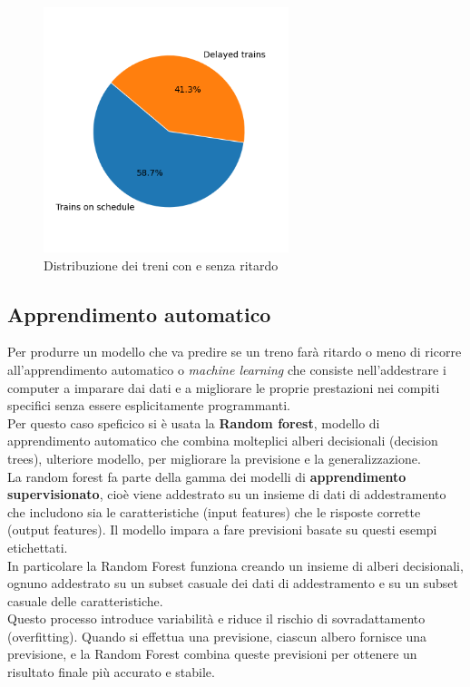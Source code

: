 \documentclass[italian,12pt,a4paper]{article}
\begin{document}
			\begin{figure}[!h]
				\centering
				\includegraphics[width=270px]{img/delay_graph}
				\caption{Distribuzione dei treni con e senza ritardo}
			\end{figure}
			
	\subsection{Apprendimento automatico}
	Per produrre un modello che va predire se un treno farà ritardo o meno di ricorre all'apprendimento automatico o \textit{machine learning} che consiste nell'addestrare i computer a imparare dai dati e a migliorare le proprie prestazioni nei compiti specifici senza essere esplicitamente programmanti.\\
	\linebreak
	Per questo caso speficico si è usata la \textbf{Random forest}, modello di apprendimento automatico che combina molteplici alberi decisionali (decision trees), ulteriore modello, per migliorare la previsione e la generalizzazione.\\
	La random forest fa parte della gamma dei modelli di \textbf{apprendimento supervisionato}, cioè viene addestrato su un insieme di dati di addestramento che includono sia le caratteristiche (input features) che le risposte corrette (output features). 
	Il modello impara a fare previsioni basate su questi esempi etichettati. \\
	\linebreak
	In particolare la Random Forest funziona creando un insieme di alberi decisionali, ognuno addestrato su un subset casuale dei dati di addestramento e su un subset casuale delle caratteristiche.\\
	Questo processo introduce variabilità e riduce il rischio di sovradattamento (overfitting). Quando si effettua una previsione, ciascun albero fornisce una previsione, e la Random Forest combina queste previsioni per ottenere un risultato finale più accurato e stabile. 
	
\end{document}

